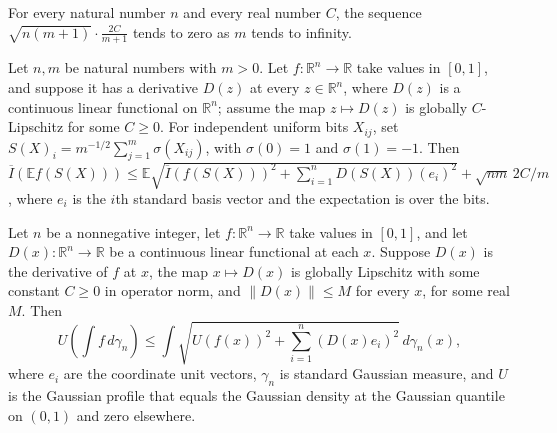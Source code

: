 \begin{lemma}
\leanok
{}
For every natural number $n$ and every real number $C$, the sequence $\sqrt{n(m+1)}\cdot\frac{2C}{m+1}$ tends to zero as $m$ tends to infinity.
\end{lemma}

\begin{lemma}
\leanok
{}
Let $n,m$ be natural numbers with $m>0$. Let $f:\mathbb R^n\to\mathbb R$ take values in
$[0,1]$, and suppose it has a derivative $D(z)$ at every $z\in\mathbb R^n$, where $D(z)$
is a continuous linear functional on $\mathbb R^n$; assume the map $z\mapsto D(z)$ is
globally $C$-Lipschitz for some $C\ge0$. For independent uniform bits $X_{ij}$, set
$S(X)_i=m^{-1/2}\sum_{j=1}^m\sigma(X_{ij})$, with $\sigma(0)=1$ and $\sigma(1)=-1$. Then
$\overline I(\mathbb E f(S(X)))\le\mathbb E\sqrt{\overline I(f(S(X)))^2+\sum_{i=1}^n
D(S(X))(e_i)^2}+\sqrt{nm}\,2C/m$, where $e_i$ is the $i$th standard basis vector and the
expectation is over the bits.
\end{lemma}

\begin{lemma}
\leanok
{}
Let $n$ be a nonnegative integer, let $f:\mathbb R^n\to\mathbb R$ take values in
$[0,1]$, and let $D(x):\mathbb R^n\to\mathbb R$ be a continuous linear functional at
each $x$. Suppose $D(x)$ is the derivative of $f$ at $x$, the map $x\mapsto D(x)$ is
globally Lipschitz with some constant $C\ge0$ in operator norm, and $\|D(x)\|\le M$ for
every $x$, for some real $M$. Then
\[
U\!\left(\int f\,d\gamma_n\right)\le \int
\sqrt{U(f(x))^2+\sum_{i=1}^n(D(x)e_i)^2}\,d\gamma_n(x),
\]
where $e_i$ are the coordinate unit vectors, $\gamma_n$ is standard Gaussian measure,
and $U$ is the Gaussian profile that equals the Gaussian density at the Gaussian
quantile on $(0,1)$ and zero elsewhere.
\end{lemma}


